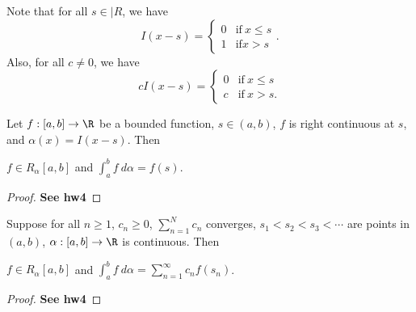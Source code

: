 \begin{remark}
    Note that for all \( s \in |R  \), we have 
    \[  I(x-s) = 
    \begin{cases}
        0 &\text{if} \ x \leq s \\
        1 &\text{if} x > s 
    \end{cases}. \]
    Also, for all \( c \neq 0  \), we have
    \[  c I(x-s) = 
    \begin{cases}
        0 &\text{if} \ x \leq s \\
        c &\text{if} \ x > s.
    \end{cases} \]
\end{remark}

\begin{theorem}[Rudin 6.15]\label{Rudin 6.15}
    Let \( f: [a,b] \to \R  \) be a bounded function, \( s \in (a,b) \), \( f  \) is right continuous at \( s  \), and \( \alpha(x) = I(x-s) \). Then 
    \begin{center}
    \( f \in {R}_{\alpha}[a,b] \) and \( \displaystyle \int_{ a }^{ b }  f  \ d \alpha  = f(s) \).
    \end{center}
\end{theorem}
\begin{proof}
    \textbf{See hw4}
\end{proof}

\begin{theorem}[Rudin 6.16]\label{Rudin 6.16}
    Suppose for all \( n \geq 1  \), \( {c}_{n} \geq 0  \), \( \displaystyle \sum_{ n=1  }^{ N  } {c}_{n} \) converges, \( {s}_{1} < {s}_{2} < {s}_{3} < \cdots   \) are points in \( (a,b) \), \( \alpha:[a,b] \to \R  \) is continuous. Then
    \begin{center}
        \( f \in {R}_{\alpha}[a,b] \) and \( \displaystyle \int_{ a }^{ b } f  \ d \alpha = \displaystyle \sum_{ n=1  }^{ \infty  } {c}_{n} f({s}_{n})  \).
    \end{center}
\end{theorem}
\begin{proof}
    \textbf{See hw4}
\end{proof}



